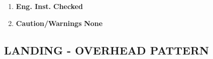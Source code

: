 \documentclass[fontInter]{TechCheck}
\begin{document}
\begin{longtablenumerate}
{\begin{tableminipage}
\begin{enumerate}
				\begin{itemize}
					\item Stick Full Forward
					\item Stick Full Aft
					\item Stick Full Left
					\item Stick Full Right
					\item Rudder Full Left
					\item Rudder Full Right
				\end{itemize}
				\item \textbf{Eng. Inst.} \dotfill \textbf{Checked}
				\item \textbf{Caution/Warnings}  \dotfill\textbf{None}
			\end{enumerate}
		\end{tableminipage}}
	\end{longtablenumerate}

	\subsection{LANDING - OVERHEAD PATTERN}
	\begin{center}
	\end{center}
\end{document}

